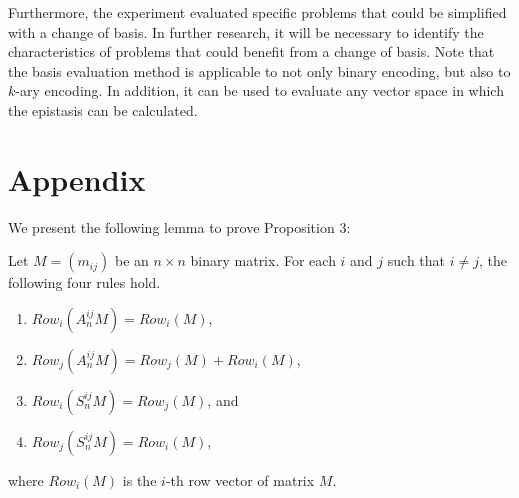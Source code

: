 Furthermore, the experiment evaluated specific problems that could be simplified with a change of basis. In further research, it will be necessary to identify the characteristics of problems that could benefit from a change of basis. Note that the basis evaluation method is applicable to not only binary encoding, but also to $ k $-ary encoding. In addition, it can be used to evaluate any vector space in which the epistasis can be calculated.


\section*{Appendix}
We present the following lemma to prove Proposition 3:
\begin{lemma}
	Let $ M=(m_{ij}) $ be an $ n\times n $ binary matrix. For each $ i $ and $ j $ such that $ i\neq j $, the following four rules hold.
	\begin{enumerate}[label=(\roman*)]
		\item $ Row_i (A_n^{ij} M)=Row_i (M) $,
		\item $ Row_j (A_n^{ij} M)=Row_j (M)+Row_i (M) $,
		\item $ Row_i (S_n^{ij} M)=Row_j (M) $, and
		\item $ Row_j (S_n^{ij} M)=Row_i (M) $,
	\end{enumerate}
	where $ Row_i (M) $ is the $ i $-th row vector of matrix $ M $.
\end{lemma}
